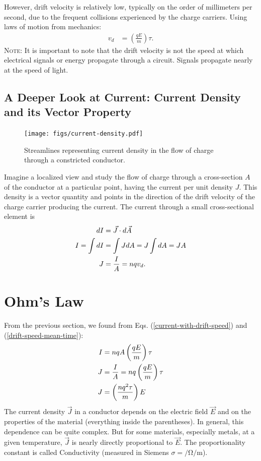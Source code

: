 \documentclass[12pt,b4paper]{article}
\begin{document}
However, drift velocity is relatively low, typically on the order of millimeters per second, due to the frequent collisions experienced by the charge carriers. Using  laws of motion from mechanics: 
\begin{align}
    v_d&=\left(\frac{qE}{m}\right)\tau.\label{drift-speed-mean-time}
\end{align}
\textsc{Note}: It is important to note that the drift velocity is not the speed at which electrical signals or energy propagate through a circuit. Signals propagate nearly at the speed of light.
\subsection{A Deeper Look at Current: Current Density and its Vector Property}
\begin{figure}[H]
    \centering
    \texttt{[image: figs/current-density.pdf]}
    \caption{Streamlines representing current density in the flow of charge through a constricted conductor.}
    \label{fig:current-density-def}
\end{figure}
Imagine a localized view and study the flow of charge through a cross-section $A$ of the conductor at a particular point, having the current per unit density $J$. This density is a vector quantity and points in the direction of the drift velocity of the charge carrier producing the current. The current through a small cross-sectional element is
\begin{align}
    dI&=\vec{J}\cdot d\vec{A}\\
    I=\int dI&=\int{J}d{A}={J}\int d{A}=JA\notag\\
    J&=\frac{I}{A}=nqv_d.
\end{align}
\section{Ohm's Law}
From the previous section, we found from Eqs. (\ref{current-with-drift-speed}) and (\ref{drift-speed-mean-time}):
\begin{align}
    I&=nqA\left(\frac{qE}{m}\right)\tau\\
    J&=\frac{I}{A}=nq\left(\frac{qE}{m}\right)\tau\notag\\
    J&=\left(\frac{nq^2\tau}{m}\right)E\label{ohms-law-with-conductivity}
\end{align}
The current density $\vec{J}$ in a conductor depends on the electric field $\vec{E}$ and on the properties
of the material (everything inside the parentheses). In general, this dependence can be quite complex. But for some materials, especially metals, at a given temperature, $\vec{J}$ is nearly directly proportional to $\vec{E}$. The proportionality constant is called Conductivity (measured in Siemens $\sigma=\unit{\per\ohm\per\meter}$).
\end{document}
